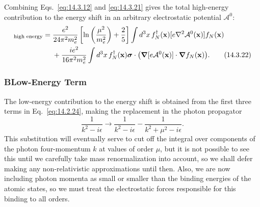 Combining Eqs.~\eqref{eq:14.3.12} and \eqref{eq:14.3.21} gives the total
high-energy contribution to the energy shift in an arbitrary electrostatic
potential $\mathcal A^0$:
\begin{align}
[\delta E_N]_{\text{high energy}}={}&
\frac{e^2}{24\pi^2m_e^2}
\left[\ln\left(\frac{\mu^2}{m_e^2}\right)+\frac25\right]
\int d^3x\,f_N^\dagger(\mathbf x)
[e\nabla^2\mathcal A^0(\mathbf x)]f_N(\mathbf x)\notag\\
&+\frac{ie^2}{16\pi^2m_e^2}\int d^3x\,
f_N^\dagger(\mathbf x)\boldsymbol\sigma\cdot
\bigl(\boldsymbol\nabla[e\mathcal A^0(\mathbf x)]
\mathbin{\cdot}\boldsymbol\nabla f_N(\mathbf x)\bigr).
\tag{14.3.22}\label{eq:14.3.22}
\end{align}

\subsubsection*{B\quad Low-Energy Term}

The low-energy contribution to the energy shift is obtained from the first
three terms in Eq.~\eqref{eq:14.2.24}, making the replacement in the photon
propagator
\begin{equation}
\frac{1}{k^2-i\epsilon}\longrightarrow
\frac{1}{k^2-i\epsilon}-\frac{1}{k^2+\mu^2-i\epsilon}.
\tag{14.3.23}\label{eq:14.3.23}
\end{equation}
This substitution will eventually serve to cut off the integral over
components of the photon four-momentum $k$ at values of order $\mu$, but it is
not possible to see this until we carefully take mass renormalization into
account, so we shall defer making any non-relativistic approximations until
then. Also, we are now including photon momenta as small or smaller than the
binding energies of the atomic states, so we must treat the electrostatic
forces responsible for this binding to all orders.

